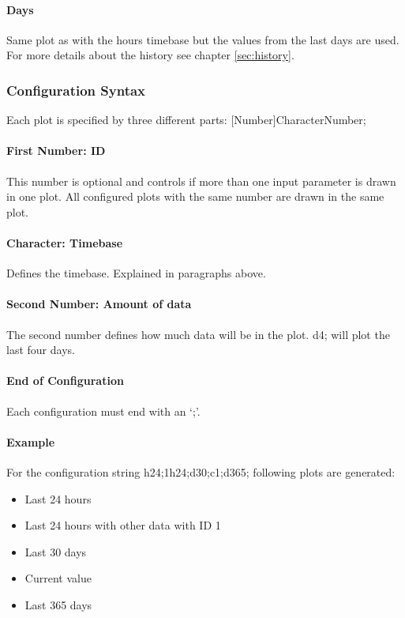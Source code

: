 \paragraph{Days} %
\label{par:days}
Same plot as with the hours timebase but the values from the last days are used. For more details about the history see chapter \ref{sec:history}.

\subsubsection{Configuration Syntax} %
\label{ssub:configuration_syntax}
Each plot is specified by three different parts: [Number]CharacterNumber;

\paragraph{First Number: ID} %
\label{par:first_number_id}
This number is optional and controls if more than one input parameter is drawn in one plot. All configured plots with the same number are drawn in the same plot.
\paragraph{Character: Timebase} %
\label{par:character}
Defines the timebase. Explained in paragraphs above.
\paragraph{Second Number: Amount of data} %
\label{par:number}
The second number defines how much data will be in the plot. d4; will plot the last four days.
\paragraph{End of Configuration} %
\label{par:end_of_configuration}
Each configuration must end with an {\C `;'}.

\paragraph{Example} %
\label{par:example}
For the configuration string {\C h24;1h24;d30;c1;d365;} following plots are generated:
\begin{itemize}
	\item Last 24 hours
	\item Last 24 hours with other data with ID 1 
	\item Last 30 days
	\item Current value
	\item Last 365 days
\end{itemize}

